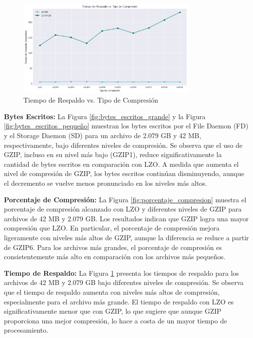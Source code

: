 \begin{figure}[H]
    \centering
    \includegraphics[width=0.8\textwidth]{tiempo_respaldo.png}
    \caption{Tiempo de Respaldo vs. Tipo de Compresión}
    \label{fig:tiempo_respaldo}
\end{figure}

\textbf{Bytes Escritos:}
La Figura \ref{fig:bytes_escritos_grande} y la Figura \ref{fig:bytes_escritos_pequeño} muestran los bytes escritos por el File Daemon (FD) y el Storage Daemon (SD) para un archivo de 2.079 GB y 42 MB, respectivamente, bajo diferentes niveles de compresión. Se observa que el uso de GZIP, incluso en su nivel más bajo (GZIP1), reduce significativamente la cantidad de bytes escritos en comparación con LZO. A medida que aumenta el nivel de compresión de GZIP, los bytes escritos continúan disminuyendo, aunque el decremento se vuelve menos pronunciado en los niveles más altos.

\textbf{Porcentaje de Compresión:}
La Figura \ref{fig:porcentaje_compresion} muestra el porcentaje de compresión alcanzado con LZO y diferentes niveles de GZIP para archivos de 42 MB y 2.079 GB. Los resultados indican que GZIP logra una mayor compresión que LZO. En particular, el porcentaje de compresión mejora ligeramente con niveles más altos de GZIP, aunque la diferencia se reduce a partir de GZIP6. Para los archivos más grandes, el porcentaje de compresión es consistentemente más alto en comparación con los archivos más pequeños.

\textbf{Tiempo de Respaldo:}
La Figura \ref{fig:tiempo_respaldo} presenta los tiempos de respaldo para los archivos de 42 MB y 2.079 GB bajo diferentes niveles de compresión. Se observa que el tiempo de respaldo aumenta con niveles más altos de compresión, especialmente para el archivo más grande. El tiempo de respaldo con LZO es significativamente menor que con GZIP, lo que sugiere que aunque GZIP proporciona una mejor compresión, lo hace a costa de un mayor tiempo de procesamiento.

